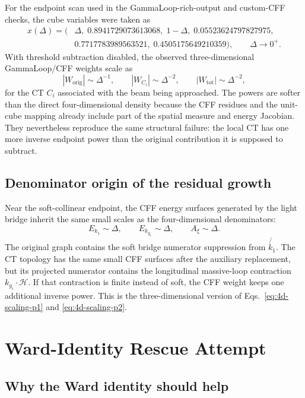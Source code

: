 \documentclass[11pt]{report}
\newcommand{\slashp}[1]{\not{#1}}
\newcommand{\kgone}{k_{g_1}}
\newcommand{\Axi}{A_\xi}
\newcommand{\Hamp}{\mathcal{H}}
\begin{document}
For the endpoint scan used in the GammaLoop-rich-output and custom-CFF
checks, the cube variables were taken as
\begin{equation}
  \begin{aligned}
  x(\Delta)=
  \bigl(&
  \Delta,\; 0.8941729073613068,\; 1-\Delta,\;
  0.05523624797827975,\\
  &0.7717783989563521,\;0.4505175649210359
  \bigr),
  \qquad \Delta\to 0^+ .
  \end{aligned}
  \label{eq:endpoint-scan}
\end{equation}
With threshold subtraction disabled, the observed three-dimensional
GammaLoop/CFF weights scale as
\[
  |W_{\mathrm{orig}}|\sim \Delta^{-1},\qquad
  |W_{C_i}|\sim \Delta^{-2},\qquad
  |W_{\mathrm{tot}}|\sim \Delta^{-2},
  \label{eq:3d-scaling}
\]
for the CT \(C_i\) associated with the beam being approached. The powers are
softer than the direct four-dimensional density because the CFF residues and
the unit-cube mapping already include part of the spatial measure and energy
Jacobian. They nevertheless reproduce the same structural failure: the local
CT has one more inverse endpoint power than the original contribution it is
supposed to subtract.

\section{Denominator origin of the residual growth}

Near the soft-collinear endpoint, the CFF energy surfaces generated by the
light bridge inherit the same small scales as the four-dimensional
denominators:
\[
  E_{k_1}\sim \Delta,\qquad
  E_{\kgone}\sim \Delta,\qquad
  \Axi \sim \Delta .
\]
The original graph contains the soft bridge numerator suppression from
\(\slashp{k_1}\). The CT topology has the same small CFF surfaces after the
auxiliary replacement, but its projected numerator contains the longitudinal
massive-loop contraction \(k_{g_i}\cdot\Hamp\). If that contraction is finite
instead of soft, the CFF weight keeps one additional inverse power. This is
the three-dimensional version of Eqs.~\eqref{eq:4d-scaling-p1} and
\eqref{eq:4d-scaling-p2}.

\chapter{Ward-Identity Rescue Attempt}

\section{Why the Ward identity should help}
\end{document}

